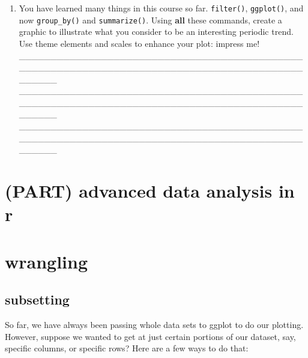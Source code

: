 \documentclass[
]{krantz}
\begin{document}
\begin{enumerate}
\item
  You have learned many things in this course so far. \texttt{filter()}, \texttt{ggplot()}, and now \texttt{group\_by()} and \texttt{summarize()}. Using \textbf{all} these commands, create a graphic to illustrate what you consider to be an interesting periodic trend. Use theme elements and scales to enhance your plot: impress me!
  \_\_\_\_\_\_\_\_\_\_\_\_\_\_\_\_\_\_\_\_\_\_\_\_\_\_\_\_\_\_\_\_\_\_\_\_\_\_\_\_\_\_\_\_\_\_\_\_\_\_\_\_\_\_\_\_\_\_\_\_\_\_\_\_\_\_\_\_\_\_\_\_\_\_\_\_\_\_\_\_\_\_\_\_\_\_\_\_\_\_\_\_\_\_\_\_
  \_\_\_\_\_\_\_\_\_\_\_\_\_\_\_\_\_\_\_\_\_\_\_\_\_\_\_\_\_\_\_\_\_\_\_\_\_\_\_\_\_\_\_\_\_\_\_\_\_\_\_\_\_\_\_\_\_\_\_\_\_\_\_\_\_\_\_\_\_\_\_\_\_\_\_\_\_\_\_\_\_\_\_\_\_\_\_\_\_\_\_\_\_\_\_\_
  \_\_\_\_\_\_\_\_\_\_\_\_\_\_\_\_\_\_\_\_\_\_\_\_\_\_\_\_\_\_\_\_\_\_\_\_\_\_\_\_\_\_\_\_\_\_\_\_\_\_\_\_\_\_\_\_\_\_\_\_\_\_\_\_\_\_\_\_\_\_\_\_\_\_\_\_\_\_\_\_\_\_\_\_\_\_\_\_\_\_\_\_\_\_\_\_
\end{enumerate}

\hypertarget{part-advanced-data-analysis-in-r}{%
\section{(PART) advanced data analysis in r}\label{part-advanced-data-analysis-in-r}}

\hypertarget{wrangling}{%
\section*{wrangling}\label{wrangling}}

\hypertarget{subsetting}{%
\subsection{subsetting}\label{subsetting}}

So far, we have always been passing whole data sets to ggplot to do our plotting. However, suppose we wanted to get at just certain portions of our dataset, say, specific columns, or specific rows? Here are a few ways to do that:
\end{document}
